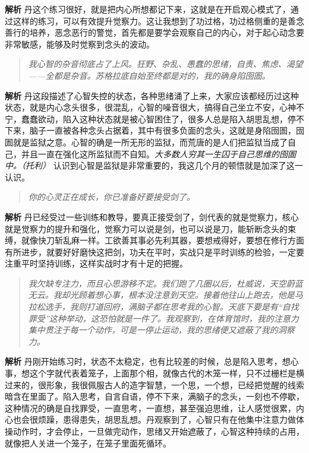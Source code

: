 \textbf{解析} 丹这个练习很好，就是把内心所想都记下来，这就是在开启观心模式了，通过这样的练习，可以有效提升觉察力。这让我想到了功过格，功过格侧重的是善念善行的培养，恶念恶行的警觉，首先都是要学会观察自己的内心，对于起心动念要非常敏感，能够及时觉察到念头的波动。

\begin{quote}\it
    我心智的杂音彻底占了上风。狂野、杂乱、愚蠢的思绪，自责、焦虑、渴望——全都是杂音。苏格拉底自始至终都是对的，我的确身陷囹圄。
\end{quote}

\textbf{解析} 丹这段描述了心智失控的状态，各种思绪涌了上来，大家应该都经历过这种状态，就是内心念头很多，很混乱，心智的噪音很大，搞得自己坐立不安，心神不宁，蠢蠢欲动，陷入这种状态就是被心智困住了，很多人总是陷入胡思乱想，停不下来，脑子一直被各种念头占据着，其中有很多负面的念头，这就是身陷囹圄，囹圄就是监狱之意。心智的确是一所无形的监狱，而荒唐的是人们把监狱当成了自己，并且一直在强化这所监狱而不自知。\textit{大多数人穷其一生囚于自己思维的囹圄中。（托利）} 认识到心智是监狱是非常重要的，我这几个月的顿悟就是加深了这一认识。

\begin{quote}\it
    你的心灵正在成长，你已准备好要接受剑了。
\end{quote}

\textbf{解析} 丹已经受过一些训练和教导，要真正接受剑了，剑代表的就是觉察力，核心就是觉察力的提升和强化，觉察力可以说是剑，也可以说是刀，能斩断念头的束缚，就像快刀斩乱麻一样。工欲善其事必先利其器，要想戒得好，要想在修行方面有所进步，就要好好磨快这把剑，功夫在平时，实战只是平时训练的检验，一定要注重平时坚持训练，这样实战时才有十足的把握。

\begin{quote}\it
    我欠缺专注力，而且心思游移不定。我们跑了几圈以后，杜威说，天空蔚蓝无云。我却光顾着想心事，根本没注意到天空。接着他往山上跑去，他是马拉松选手，我则打道回府，满脑子都在思考我的心智。天底下要是有“自找罪受”这种举动，这恐怕就是一件了。我观察到，在体育馆时，我的注意力集中贯注于每一个动作，可是一停止运动，我的思绪便又遮蔽了我的洞察力。
\end{quote}

\textbf{解析} 丹刚开始练习时，状态不太稳定，也有比较差的时候，总是陷入思考，想心事，想这个字就代表着笼子，上面那个相，就像古代的木笼一样，只不过栅栏是横过来的，很形象，我很佩服古人的造字智慧，一个思，一个想，已经把觉醒的线索暗含在里面了。陷入思考，自言自语，停不下来，满脑子的念头，一刻也不停歇，这种情况的确是自找罪受，一直思考，一直想，甚至强迫思维，让人感觉很累，内心也会很烦躁，患得患失，胡思乱想。丹观察到了，心智只有在他集中注意力做体操动作时，才会停止，一旦做完动作，思绪又开始遮蔽了，心智这种持续的占用，就像把人关进一个笼子，在笼子里面死循环。

